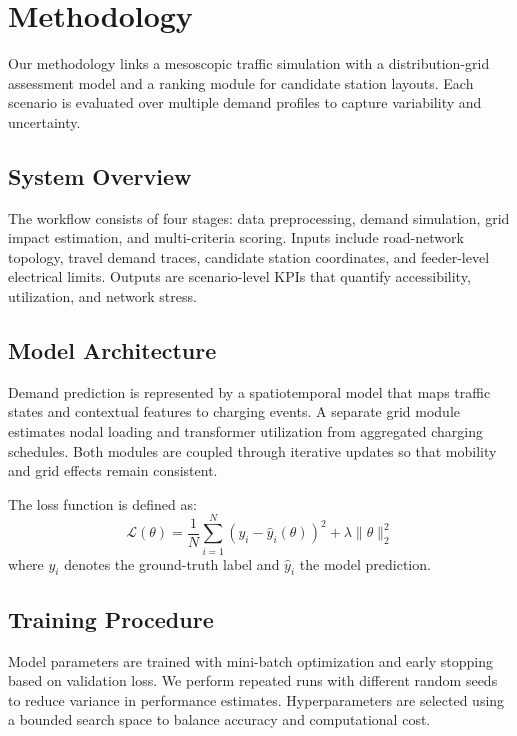\section{Methodology}
\label{sec:methodology}
Our methodology links a mesoscopic traffic simulation with a distribution-grid assessment model and a ranking module for candidate station layouts. Each scenario is evaluated over multiple demand profiles to capture variability and uncertainty.

\subsection{System Overview}
The workflow consists of four stages: data preprocessing, demand simulation, grid impact estimation, and multi-criteria scoring. Inputs include road-network topology, travel demand traces, candidate station coordinates, and feeder-level electrical limits. Outputs are scenario-level KPIs that quantify accessibility, utilization, and network stress.

\subsection{Model Architecture}
Demand prediction is represented by a spatiotemporal model that maps traffic states and contextual features to charging events. A separate grid module estimates nodal loading and transformer utilization from aggregated charging schedules. Both modules are coupled through iterative updates so that mobility and grid effects remain consistent.

The loss function is defined as:
\begin{equation}
    \mathcal{L}(\theta) = \frac{1}{N} \sum_{i=1}^{N}
        \left( y_i - \hat{y}_i(\theta) \right)^2 + \lambda \|\theta\|_2^2
    \label{eq:loss}
\end{equation}
where $y_i$ denotes the ground-truth label and $\hat{y}_i$ the model prediction.

\subsection{Training Procedure}
Model parameters are trained with mini-batch optimization and early stopping based on validation loss. We perform repeated runs with different random seeds to reduce variance in performance estimates. Hyperparameters are selected using a bounded search space to balance accuracy and computational cost.

